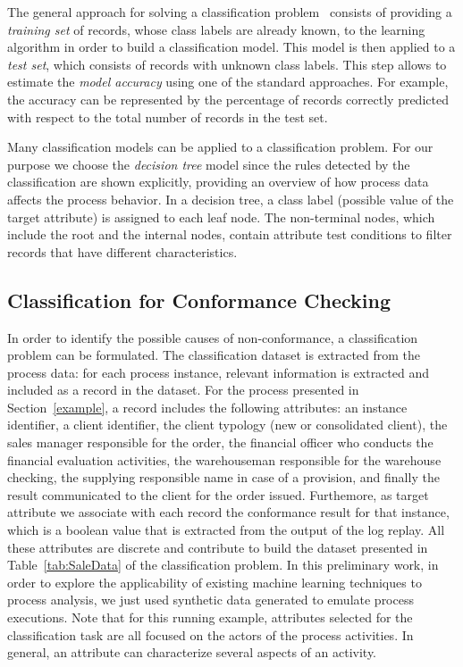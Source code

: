 \documentclass{llncs}
\begin{document}
The general approach for solving a classification problem~\cite{tan2005introduction} consists of providing a \emph{training set} of records, whose class labels are already known, to the learning algorithm in order to build a classification model. This model is then applied to a \emph{test set}, which consists of records with unknown class labels. This step allows to  estimate the \emph{model accuracy} using one of the standard approaches. For example, the accuracy can be represented by the percentage  of records correctly predicted  with respect to the total number of records in the test set.

Many classification models can be applied to a classification problem. For our purpose we choose the \emph{decision tree} model since the rules detected by the classification are shown explicitly, providing an overview of how process data affects the process behavior. In a decision tree, a class label (possible value of the target attribute) is assigned to each leaf node. The non-terminal nodes, which include the root and the internal nodes, contain attribute test conditions to filter records that have different characteristics.

\subsection{Classification for Conformance Checking}\label{ClassConformance}
In order to identify the possible causes of non-conformance, a classification problem can be formulated. The classification dataset is extracted from the process data: for each process instance, relevant information is  extracted and included as a record in the dataset. For the process presented in Section~\ref{example}, a record includes  the following attributes: an instance identifier, a  client identifier, the client typology (new or consolidated client), the sales manager responsible for the order, the financial officer who conducts the financial evaluation activities, the warehouseman responsible for the warehouse checking, the supplying responsible name in case of a provision, and finally the result communicated to the client for the order issued. Furthemore, as target attribute we associate with each record the conformance result for that instance,  which is a boolean value that is extracted from the output of the log replay. All these attributes are discrete and contribute to build the dataset
presented in Table~\ref{tab:SaleData} of the classification problem. In this preliminary work,  in order to 
explore the applicability of existing machine learning  techniques to process analysis, we just used synthetic data
generated to emulate process executions. Note that for this  running example, attributes selected for the classification task are all focused on the actors of the process activities. In general, an attribute can characterize several aspects of an activity.
\end{document}
